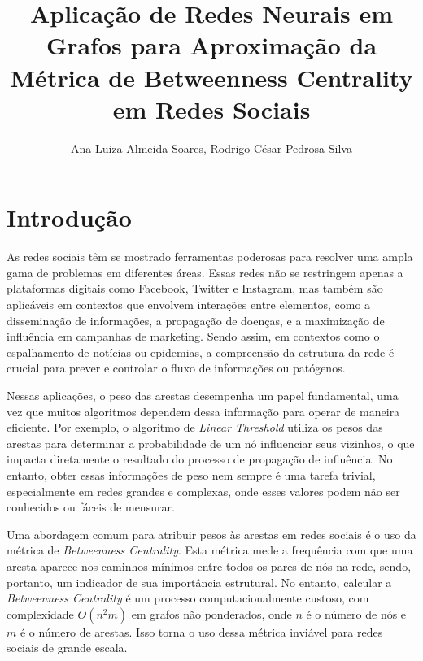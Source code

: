 \documentclass[12pt]{article}
\title{Aplicação de Redes Neurais em Grafos para Aproximação da Métrica de Betweenness Centrality em Redes Sociais}
\author{Ana Luiza Almeida Soares\inst{1}, Rodrigo César Pedrosa Silva\inst{1}} %
\begin{document}
\maketitle %

     

\section{Introdução}

As redes sociais têm se mostrado ferramentas poderosas para resolver uma ampla gama de problemas em diferentes áreas. Essas redes não se restringem apenas a plataformas digitais como Facebook, Twitter e Instagram, mas também são aplicáveis em contextos que envolvem interações entre elementos, como a disseminação de informações, a propagação de doenças, e a maximização de influência em campanhas de marketing. Sendo assim, em contextos como o espalhamento de notícias ou epidemias, a compreensão da estrutura da rede é crucial para prever e controlar o fluxo de informações ou patógenos.

Nessas aplicações, o peso das arestas desempenha um papel fundamental, uma vez que muitos algoritmos dependem dessa informação para operar de maneira eficiente. Por exemplo, o algoritmo de \textit{Linear Threshold} utiliza os pesos das arestas para determinar a probabilidade de um nó influenciar seus vizinhos, o que impacta diretamente o resultado do processo de propagação de influência. No entanto, obter essas informações de peso nem sempre é uma tarefa trivial, especialmente em redes grandes e complexas, onde esses valores podem não ser conhecidos ou fáceis de mensurar.

Uma abordagem comum para atribuir pesos às arestas em redes sociais é o uso da métrica de \textit{Betweenness Centrality}. Esta métrica mede a frequência com que uma aresta aparece nos caminhos mínimos entre todos os pares de nós na rede, sendo, portanto, um indicador de sua importância estrutural. No entanto, calcular a \textit{Betweenness Centrality} é um processo computacionalmente custoso, com complexidade \(O(n^2 m)\) em grafos não ponderados, onde \(n\) é o número de nós e \(m\) é o número de arestas. Isso torna o uso dessa métrica inviável para redes sociais de grande escala.
\end{document}
